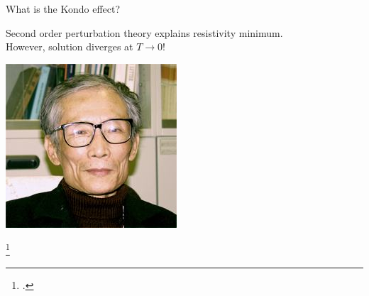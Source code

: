 \documentclass[aspectratio=169]{beamer}
\begin{document}
\begin{frame}{What is the Kondo effect?}
\begin{minipage}{0.8\textwidth}
Second order perturbation theory explains resistivity minimum.\\
However, solution \alert{diverges} at \(T \to 0\)!
\end{minipage}
\begin{minipage}{0.1\textwidth}
\includegraphics[width=\textwidth]{kondo.jpg}\\
\end{minipage}
\footcite{deHaas1939,Sarachik1964,Heeger1969,kondo1964resistance}
\end{frame}
\end{document}
